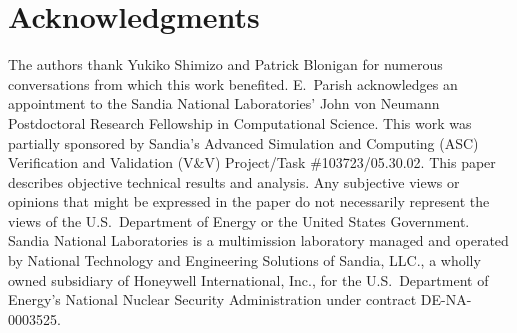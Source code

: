 \documentclass[3p,computermodern,10pt]{elsarticle}
\begin{document}


\section{Acknowledgments}
The authors thank Yukiko Shimizo and Patrick Blonigan for numerous conversations from which this work benefited. 
E.\ Parish acknowledges an appointment to the Sandia National Laboratories'
John von Neumann Postdoctoral Research Fellowship in Computational Science. 
This work was partially sponsored by Sandia's Advanced Simulation and
Computing (ASC) Verification and Validation (V\&V) Project/Task
\#103723/05.30.02.  This paper describes objective technical results and
analysis. Any subjective views or opinions that might be expressed in the
paper do not necessarily represent the views of the U.S.\ Department of Energy
or the United States Government.  Sandia National Laboratories is a
multimission laboratory managed and operated by National Technology and
Engineering Solutions of Sandia, LLC., a wholly owned subsidiary of Honeywell
International, Inc., for the U.S.\  Department of Energy's National Nuclear
Security Administration under contract DE-NA-0003525.
\end{document}

